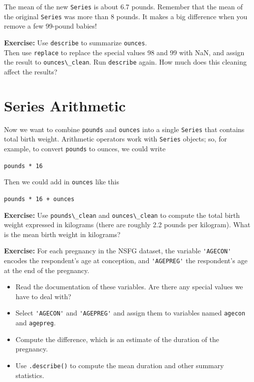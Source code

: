 The mean of the new \passthrough{\lstinline!Series!} is about 6.7
pounds. Remember that the mean of the original
\passthrough{\lstinline!Series!} was more than 8 pounds. It makes a big
difference when you remove a few 99-pound babies!

\textbf{Exercise:} Use \passthrough{\lstinline!describe!} to summarize
\passthrough{\lstinline!ounces!}.\\
Then use \passthrough{\lstinline!replace!} to replace the special values
98 and 99 with NaN, and assign the result to
\passthrough{\lstinline!ounces\_clean!}. Run
\passthrough{\lstinline!describe!} again. How much does this cleaning
affect the results?

\hypertarget{series-arithmetic}{%
\section{Series Arithmetic}\label{series-arithmetic}}

Now we want to combine \passthrough{\lstinline!pounds!} and
\passthrough{\lstinline!ounces!} into a single
\passthrough{\lstinline!Series!} that contains total birth weight.
Arithmetic operators work with \passthrough{\lstinline!Series!} objects;
so, for example, to convert \passthrough{\lstinline!pounds!} to ounces,
we could write

\passthrough{\lstinline!pounds * 16!}

Then we could add in \passthrough{\lstinline!ounces!} like this

\passthrough{\lstinline!pounds * 16 + ounces!}

\textbf{Exercise:} Use \passthrough{\lstinline!pounds\_clean!} and
\passthrough{\lstinline!ounces\_clean!} to compute the total birth
weight expressed in kilograms (there are roughly 2.2 pounds per
kilogram). What is the mean birth weight in kilograms?

\textbf{Exercise:} For each pregnancy in the NSFG dataset, the variable
\passthrough{\lstinline!'AGECON'!} encodes the respondent's age at
conception, and \passthrough{\lstinline!'AGEPREG'!} the respondent's age
at the end of the pregnancy.

\begin{itemize}
\item
  Read the documentation of these variables. Are there any special
  values we have to deal with?
\item
  Select \passthrough{\lstinline!'AGECON'!} and
  \passthrough{\lstinline!'AGEPREG'!} and assign them to variables named
  \passthrough{\lstinline!agecon!} and
  \passthrough{\lstinline!agepreg!}.
\item
  Compute the difference, which is an estimate of the duration of the
  pregnancy.
\item
  Use \passthrough{\lstinline!.describe()!} to compute the mean duration
  and other summary statistics.
\end{itemize}

